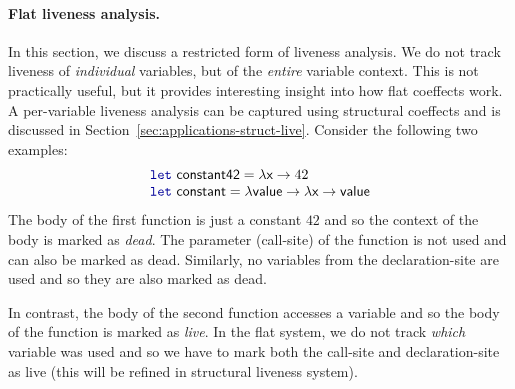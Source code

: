 \paragraph{Flat liveness analysis.}
In this section, we discuss a restricted form of liveness analysis. We do not track liveness of 
\emph{individual} variables, but of the \emph{entire} variable context. This is not practically
useful, but it provides interesting insight into how flat coeffects work. A per-variable liveness
analysis can be captured using structural coeffects and is discussed in Section~\ref{sec:applications-struct-live}.
Consider the following two examples:
%
\begin{equation*}
\begin{array}{l}
\kvd{let}~\ident{constant42} = \lambda \ident{x} \rightarrow 42\\
\kvd{let}~\ident{constant} = \lambda \ident{value} \rightarrow \lambda \ident{x} \rightarrow \ident{value}
\end{array}
\end{equation*}
%
The body of the first function is just a constant $42$ and so the context of the body is marked
as \emph{dead}. The parameter (call-site) of the function is not used and can also be marked as dead. 
Similarly, no variables from the declaration-site are used and so they are also marked as dead.

In contrast, the body of the second function accesses a variable  and so the body 
of the function is marked as \emph{live}. In the flat system, we do not track \emph{which} 
variable was used and so we have to mark both the call-site and declaration-site as live (this will
be refined in structural liveness system).

